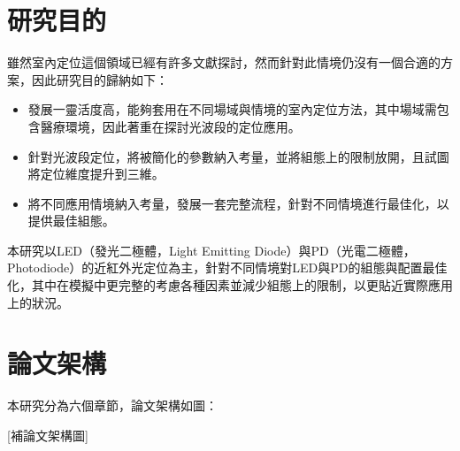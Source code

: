 




\section{研究目的}

雖然室內定位這個領域已經有許多文獻探討，然而針對此情境仍沒有一個合適的方案，因此研究目的歸納如下：


\begin{itemize} 
    \item 發展一靈活度高，能夠套用在不同場域與情境的室內定位方法，其中場域需包含醫療環境，因此著重在探討光波段的定位應用。  
    \item 針對光波段定位，將被簡化的參數納入考量，並將組態上的限制放開，且試圖將定位維度提升到三維。
    \item 將不同應用情境納入考量，發展一套完整流程，針對不同情境進行最佳化，以提供最佳組態。
\end{itemize}


本研究以LED（發光二極體，Light Emitting Diode）與PD（光電二極體，Photodiode）的近紅外光定位為主，針對不同情境對LED與PD的組態與配置最佳化，其中在模擬中更完整的考慮各種因素並減少組態上的限制，以更貼近實際應用上的狀況。






\section{論文架構}
本研究分為六個章節，論文架構如圖：

[補論文架構圖]


